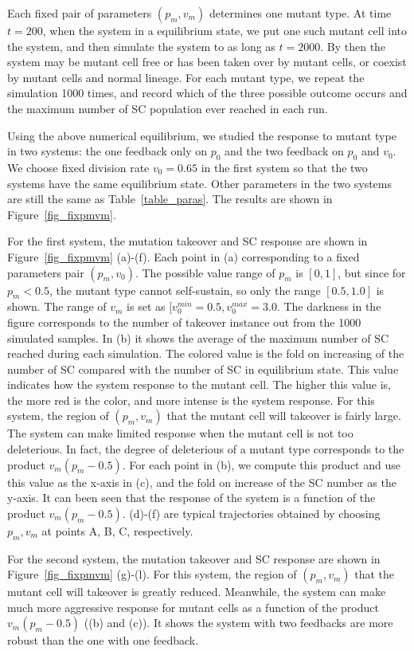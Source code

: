 \documentclass[12pt]{article}
\begin{document}
Each fixed pair of parameters $(p_m, v_m)$ 
determines one mutant type. At time $t=200$, when 
the system in a equilibrium state, we put one such mutant
cell into the system, and then simulate the system to as long
as $t=2000$. By then the system may be mutant cell free or 
has been taken over by mutant cells, or coexist by mutant cells 
and normal lineage. For each mutant type, we repeat the simulation
1000 times, and record which of the three possible outcome occurs
and the maximum number of SC population ever reached in each run.

Using the above numerical equilibrium, we studied the response to
mutant type in two systems: the one feedback only on $p_0$
and the two feedback on $p_0$ and $v_0$. We choose 
fixed division rate $v_0=0.65$ in the first system so that the two 
systems have the same equilibrium state. 
Other parameters in the two systems are 
still the same as Table~\ref{table_paras}. The results 
are shown in Figure~\ref{fig_fixpmvm}.

For the first system, the mutation takeover and SC response are shown
in Figure~\ref{fig_fixpmvm} (a)-(f). 
Each point in (a) corresponding to a fixed
parameters pair $(p_m, v_0)$. The possible value range of $p_m$ is $[0, 1]$,
but since for $p_m<0.5$, the mutant type cannot self-sustain, so only the
range $[0.5,1.0]$ is shown. The range of $v_m$ is set as 
$[v_0^{min}=0.5, v_0^{max}=3.0$. The darkness in the figure corresponds
to the number of takeover instance out from the 1000 simulated samples.
In (b) it shows the average of the maximum number of SC reached during 
each simulation. The colored value is the fold on increasing of the number
of SC compared with the number of SC in equilibrium state. 
This value indicates how the system response to the 
mutant cell. The higher this value is, the more red is the color,
and more intense is the system response. For this system, the region
of $(p_m, v_m)$ that the mutant cell will takeover is fairly large.
The system can make limited response when the mutant cell is not 
too deleterious. In fact, the degree of deleterious of a mutant type
corresponds to the product $v_m (p_m - 0.5)$. For each point 
in (b), we compute this product and use this value as the x-axis
in (c), and the fold on increase of the SC number as the y-axis.  
It can been seen that the response of the system is a function of
the product $v_m (p_m - 0.5)$. (d)-(f) are typical trajectories
obtained by choosing $p_m, v_m$ at points A, B, C, respectively.

For the second system, the mutation takeover and SC response
are shown in Figure~\ref{fig_fixpmvm} (g)-(l). 
For this system, the region
of $(p_m, v_m)$ that the mutant cell will takeover is greatly reduced.
Meanwhile, the system can make much more aggressive 
response for mutant cells as a function of
the product $v_m (p_m - 0.5)$ ((b) and (c)).
It shows the system with two feedbacks are more robust than
the one with one feedback.
\end{document}
